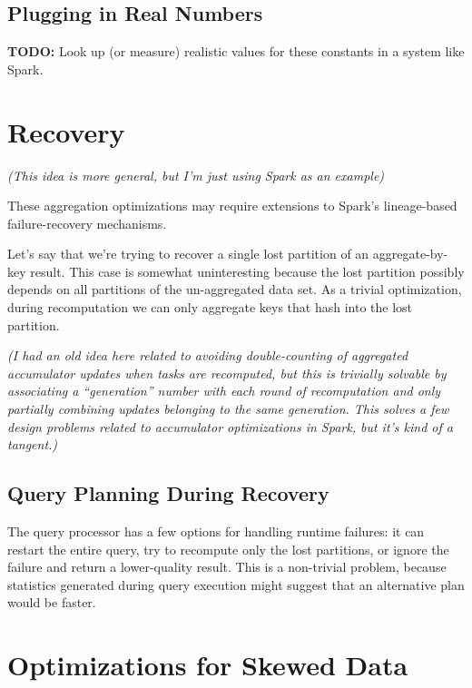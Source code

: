 \documentclass[12pt]{article}
\begin{document}
\subsection{Plugging in Real Numbers}

\textbf{TODO:} Look up (or measure) realistic values for these constants in
a system like Spark.









\pagebreak

\section{Recovery}

\emph{(This idea is more general, but I'm just using Spark as an example)}

These aggregation optimizations may require extensions to Spark's lineage-based failure-recovery mechanisms.

Let's say that we're trying to recover a single lost partition of an
aggregate-by-key result.  This case is somewhat uninteresting because the lost
partition possibly depends on all partitions of the un-aggregated data set.
As a trivial optimization, during recomputation we can only aggregate keys
that hash into the lost partition.

\emph{(I had an old idea here related to avoiding double-counting of
aggregated accumulator updates when tasks are recomputed, but this is
trivially solvable by associating a ``generation'' number with each round of
recomputation and only partially combining updates belonging to the same
generation.  This solves a few design problems related to accumulator
optimizations in Spark, but it's kind of a tangent.)}

\subsection{Query Planning During Recovery}

The query processor has a few options for handling runtime failures: it can
restart the entire query, try to recompute only the lost partitions, or ignore
the failure and return a lower-quality result.  This is a non-trivial problem,
because statistics generated during query execution might suggest that an
alternative plan would be faster.


\pagebreak
\section{Optimizations for Skewed Data}
\end{document}
